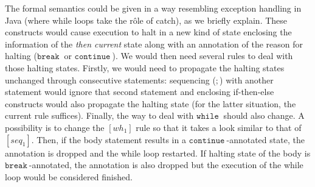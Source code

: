 \documentclass[a4wide,12pt]{article}
\def\while{\texttt{while}\ }
\def\cont {\texttt{continue}\ }
\def\breakc{\texttt{break}\ }
\begin{document}
The formal semantics could be given in a way resembling exception handling in Java (where while loops take
the r\^{o}le of catch), as we briefly explain. These constructs
would cause execution to halt in a new kind of state
enclosing the information of the \emph{then current} state along with an annotation of the reason
for halting ($\breakc$ or $\cont$). 
We would then need several rules to deal with those halting states.
Firstly, we would need to propagate the halting states unchanged through consecutive statements:
sequencing ($;$) with another statement would ignore that second statement and enclosing
if-then-else constructs would also propagate the halting state (for the latter situation, the current
rule suffices). Finally, the way to deal with $\while$ should also change. A possibility
is to change the $[wh_1]$ rule so that it takes a look similar to that of $[seq_1]$.
Then, if the body statement results in a $\cont$-annotated state, the annotation is dropped
and the while loop restarted. If halting state of the body is $\breakc$-annotated,
the annotation is also
dropped but the execution of the while loop would be considered finished.
 
\end{document}

